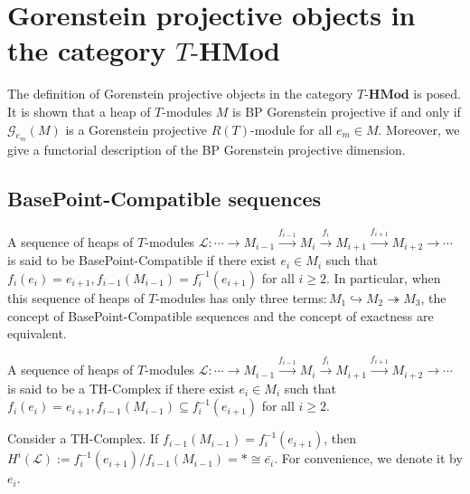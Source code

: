 \documentclass[11pt, twoside]{article}
\begin{document}
\section{Gorenstein projective objects in the category $T\textbf{-HMod}$}

The definition of Gorenstein projective objects in the category $T\textbf{-HMod}$ is posed. It is shown that a heap of $T$-modules $M$ is BP Gorenstein projective if and only if $\mathcal{G}_{e_m}(M)$ is a Gorenstein projective $R(T)$-module for all $e_m\in M$. Moreover, we give a functorial description of the BP Gorenstein projective dimension.

\subsection{BasePoint-Compatible sequences}

\begin{definition}
A sequence of heaps of $T$-modules $ \mathcal{L}: \cdots \to M_{i-1} \xrightarrow{f_{i-1}} M_i \xrightarrow{f_i} M_{i+1} \xrightarrow{f_{i+1}} M_{i+2} \to \cdots $ is said to be BasePoint-Compatible if there exist $e_i \in M_i$ such that $f_i(e_i) = e_{i+1} , f_{i-1}(M_{i-1}) = f_i^{-1}(e_{i+1})$
for all $i \geq 2$. In particular, when this sequence of heaps of $T$-modules has only three terms$:M_1\hookrightarrow M_2 \twoheadrightarrow M_3$, the concept of BasePoint-Compatible sequences and the concept of exactness are equivalent.
\end{definition}

\begin{definition}
A sequence of heaps of $T$-modules $ \mathcal{L}: \cdots \to M_{i-1} \xrightarrow{f_{i-1}} M_i \xrightarrow{f_i} M_{i+1} \xrightarrow{f_{i+1}} M_{i+2} \to \cdots$ is said to be a TH-Complex if there exist $e_i \in M_i$ such that $f_i(e_i) = e_{i+1} , f_{i-1}(M_{i-1}) \subseteq f_i^{-1}(e_{i+1})$
for all $i \geq 2$.
\end{definition}

Consider a TH-Complex. If $f_{i-1}(M_{i-1}) = f_i^{-1}(e_{i+1})$, then $H^i(\mathcal{L}):= f_i^{-1}(e_{i+1})/f_{i-1}(M_{i-1}) = \ast \cong \bar{e_i}$. For convenience, we denote it by $e_i$.
\end{document}
